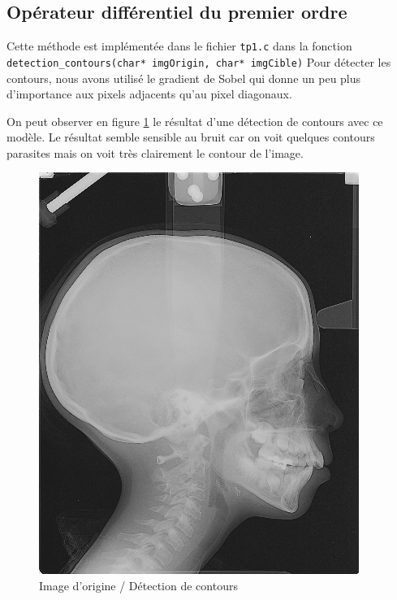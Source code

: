 \documentclass[paper=a4, fontsize=11pt]{scrartcl} %
\begin{document}
\subsection{Opérateur différentiel du premier ordre}
Cette méthode est implémentée dans le fichier \texttt{tp1.c} dans la fonction \texttt{detection\_contours(char* imgOrigin, char* imgCible)}
Pour détecter les contours, nous avons utilisé le gradient de Sobel qui donne un peu plus d'importance aux pixels adjacents qu'au pixel diagonaux.

On peut observer en figure \ref{Contour1ordre} le résultat d'une détection de contours avec ce modèle. Le résultat semble sensible au bruit car on voit quelques contours parasites mais on voit très clairement le contour de l'image.

\begin{figure} [h!]
\centering
\caption{Image d'origine / Détection de contours}
\label{Contour1ordre}
\includegraphics[scale=0.5]{images/rapport/radio1.png} 

\end{figure}
\end{document}
